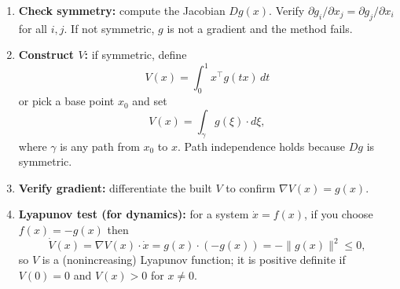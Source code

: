 \begin{enumerate}
  \item \textbf{Check symmetry:} compute the Jacobian \(Dg(x)\). Verify \(\partial g_i/\partial x_j=\partial g_j/\partial x_i\) for all \(i,j\). If not symmetric, \(g\) is not a gradient and the method fails.
  \item \textbf{Construct \(V\):} if symmetric, define
  \[
  V(x)=\int_{0}^{1} x^\top g(tx)\,dt
  \]
  or pick a base point \(x_0\) and set
  \[
  V(x)=\int_{\gamma} g(\xi)\cdot d\xi,
  \]
  where \(\gamma\) is any path from \(x_0\) to \(x\). Path independence holds because \(Dg\) is symmetric.
  \item \textbf{Verify gradient:} differentiate the built \(V\) to confirm \(\nabla V(x)=g(x)\).
  \item \textbf{Lyapunov test (for dynamics):} for a system \(\dot x=f(x)\), if you choose \(f(x)=-g(x)\) then
  \[
  \dot V(x)=\nabla V(x)\cdot\dot x = g(x)\cdot(-g(x))=-\|g(x)\|^2\le 0,
  \]
  so \(V\) is a (nonincreasing) Lyapunov function; it is positive definite if \(V(0)=0\) and \(V(x)>0\) for \(x\neq0\).
\end{enumerate}

